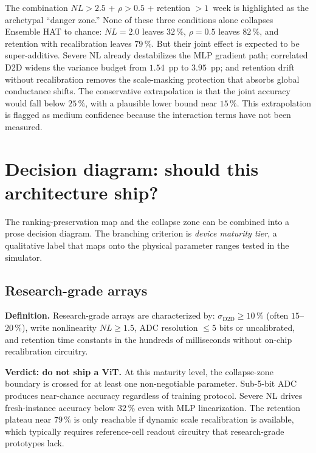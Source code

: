The combination $NL > 2.5$ + $\rho > 0.5$ + retention $> 1$~week is highlighted as the archetypal ``danger zone.''  None of these three conditions alone collapses Ensemble HAT to chance: $NL=2.0$ leaves $32\,\%$, $\rho=0.5$ leaves $82\,\%$, and retention with recalibration leaves $79\,\%$.  But their joint effect is expected to be super-additive.  Severe NL already destabilizes the MLP gradient path; correlated D2D widens the variance budget from $1.54$~pp to $3.95$~pp; and retention drift without recalibration removes the scale-masking protection that absorbs global conductance shifts.  The conservative extrapolation is that the joint accuracy would fall below $25\,\%$, with a plausible lower bound near $15\,\%$.  This extrapolation is flagged as medium confidence because the interaction terms have not been measured.


\section{Decision diagram: should this architecture ship?}
\label{sec:decision-diagram}

The ranking-preservation map and the collapse zone can be combined into a prose decision diagram.  The branching criterion is \emph{device maturity tier}, a qualitative label that maps onto the physical parameter ranges tested in the simulator.

\subsection{Research-grade arrays}

\textbf{Definition.}  Research-grade arrays are characterized by: $\sigma_{\mathrm{D2D}} \ge 10\,\%$ (often $15$--$20\,\%$), write nonlinearity $NL \ge 1.5$, ADC resolution $\le 5$ bits or uncalibrated, and retention time constants in the hundreds of milliseconds without on-chip recalibration circuitry.

\textbf{Verdict: do not ship a ViT.}  At this maturity level, the collapse-zone boundary is crossed for at least one non-negotiable parameter.  Sub-5-bit ADC produces near-chance accuracy regardless of training protocol.  Severe NL drives fresh-instance accuracy below $32\,\%$ even with MLP linearization.  The retention plateau near $79\,\%$ is only reachable if dynamic scale recalibration is available, which typically requires reference-cell readout circuitry that research-grade prototypes lack.

